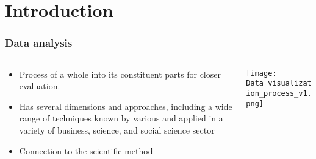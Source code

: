 \section{Introduction}
\SectionPage

\begin{frame}
    \frametitle{Data analysis}
    \vspace*{\fill}

    \begin{columns}[onlytextwidth, c]
        \begin{column}{0.5\textwidth}
            \begin{itemize}[<+-|alert@+>]
                \item Process of  a whole into its constituent parts for closer evaluation.
                \item Has several dimensions and approaches, including a wide
                      range of techniques known by various  and applied in a variety of
                      business, science, and social science sector
                \item Connection to the scientific method
            \end{itemize}
        \end{column}
        \begin{column}{0.5\textwidth}
            \texttt{[image: Data\_visualization\_process\_v1.png]}
        \end{column}
    \end{columns}
    \vspace*{\fill}
\end{frame}

